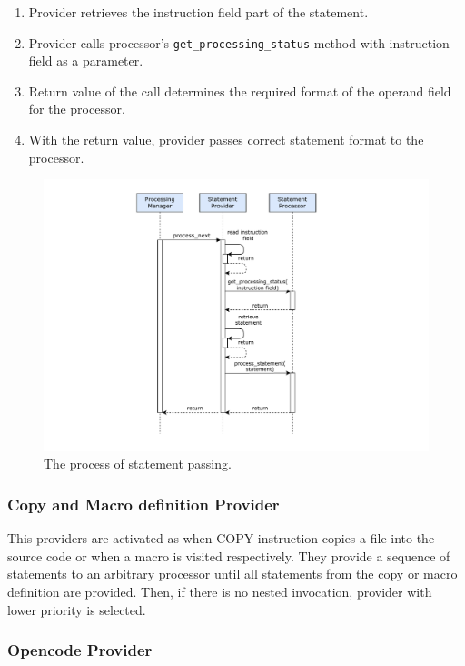 \begin{enumerate}
	\item Provider retrieves the instruction field part of the statement.
	\item Provider calls processor's \texttt{get\_processing\_status} method with instruction field as a parameter.
	\item Return value of the call determines the required format of the operand field for the processor.
	\item With the return value, provider passes correct statement format to the processor. 
\end{enumerate}

\begin{figure}
	\centering
	\includegraphics[width=13cm]{img/process_next}
	\caption{The process of statement passing.}
	\label{fig06:process_next}
\end{figure}


\subsubsection{Copy and Macro definition Provider}

This providers are activated as when COPY instruction copies a file into the source code or when a macro is visited respectively. They provide a sequence of statements to an arbitrary processor until all statements from the copy or macro definition are provided. Then, if there is no nested invocation, provider with lower priority is selected.

\subsubsection{Opencode Provider}


